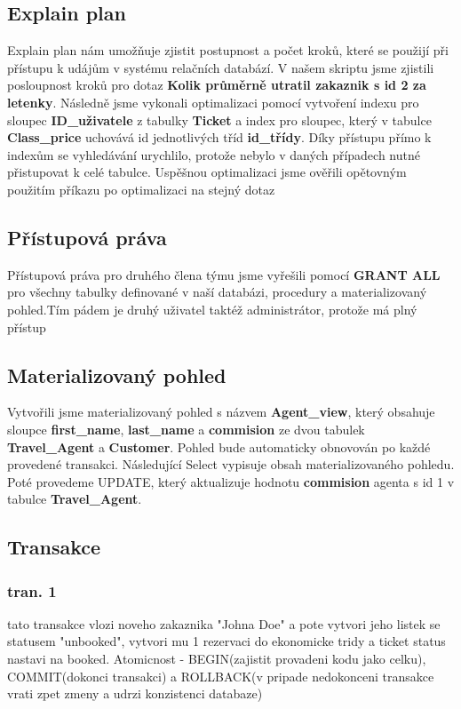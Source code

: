 \documentclass[a4paper, 11pt]{article}
\begin{document}
{    \subsection{Explain plan}
        Explain plan nám umožňuje zjistit postupnost a počet kroků, které se použijí při přístupu k udájům v systému relačních databází. V našem skriptu jsme zjistili posloupnost kroků pro dotaz \textbf{Kolik průměrně utratil zakaznik s id 2 za letenky}. Následně jsme vykonali optimalizaci pomocí vytvoření indexu pro sloupec \textbf{ID\_uživatele} z tabulky \textbf{Ticket} a index pro sloupec, který v tabulce  \textbf{Class\_price} uchovává id jednotlivých tříd \textbf{id\_třídy}. Díky přístupu přímo k indexům se vyhledávání urychlilo, protože nebylo v daných případech nutné přistupovat k celé tabulce. Uspěšnou optimalizaci jsme ověřili opětovným použitím  příkazu po optimalizaci na stejný dotaz

    \subsection{Přístupová práva}
    Přístupová práva pro druhého člena týmu jsme vyřešili pomocí \textbf{GRANT ALL} pro všechny tabulky definované v naší databázi, procedury a materializovaný pohled.Tím pádem je druhý uživatel taktéž administrátor, protože má plný přístup

    \subsection{Materializovaný pohled}
    Vytvořili jsme materializovaný pohled s názvem \textbf{Agent\_view}, který obsahuje sloupce \textbf{first\_name}, \textbf{last\_name} a \textbf{commision} ze dvou tabulek \textbf{Travel\_Agent} a \textbf{Customer}. Pohled bude automaticky obnovován po každé provedené transakci. Následující Select vypisuje obsah materializovaného pohledu.
    Poté provedeme UPDATE, který aktualizuje hodnotu \textbf{commision} agenta s id 1 v tabulce \textbf{Travel\_Agent}.
    
    \subsection{Transakce}
     \subsubsection{tran. 1}
 tato transakce vlozi noveho zakaznika "Johna Doe" a pote vytvori jeho listek se statusem "unbooked", vytvori mu 1 rezervaci do ekonomicke tridy a ticket status nastavi na booked. Atomicnost - BEGIN(zajistit provadeni kodu jako celku), COMMIT(dokonci transakci) a ROLLBACK(v pripade nedokonceni transakce vrati zpet zmeny a udrzi konzistenci databaze)

}
\end{document}
